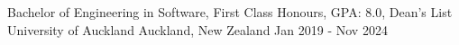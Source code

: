 
\begin{cventries}
  \cventry
    {Bachelor of Engineering in Software, First Class Honours, GPA: 8.0, Dean's List} %
    {University of Auckland} %
    {Auckland, New Zealand} %
    {Jan 2019 - Nov 2024} %
    \item{}
    \vspace{-15mm}

\end{cventries}

